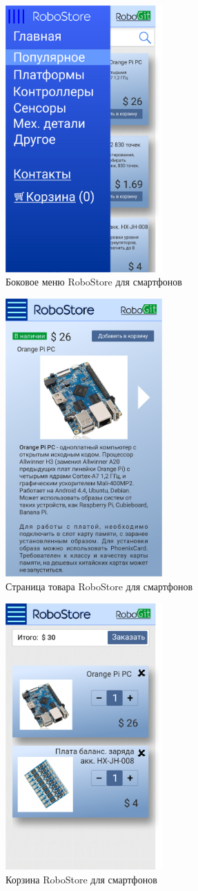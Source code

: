 \documentclass[12pt, a4paper]{article}
\begin{document}
\begin{figure}[H]
  \centering
  \includegraphics[width=6cm]{png/store_menu_smart.png}
  \caption{Боковое меню RoboStore для смартфонов}
\end{figure}

\begin{figure}[H]
  \centering
  \includegraphics[width=6cm]{png/store_item_smart.png}
  \caption{Страница товара RoboStore для смартфонов}
\end{figure}

\begin{figure}[H]
  \centering
  \includegraphics[width=6cm]{png/store_bin_smart.png}
  \caption{Корзина RoboStore для смартфонов}
\end{figure}
\end{document}
